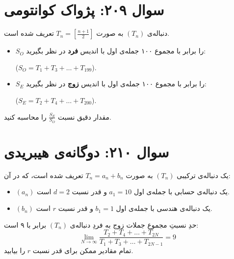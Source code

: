 \documentclass[12pt]{article}
\begin{document}
\section*{سوال ۲۰۹: پژواک کوانتومی}
دنباله‌ی $(T_n)$ به صورت $T_n = \left[\frac{n+1}{2}\right]$ تعریف شده است.
\begin{itemize}[rightmargin=2cm]
	\item $S_O$ را برابر با مجموع ۱۰۰ جمله‌ی اول با اندیس \textbf{فرد} در نظر بگیرید:
	
	\vspace{0.1cm}
	 ($S_O = T_1 + T_3 + \dots + T_{199}$).
	\item $S_E$ را برابر با مجموع ۱۰۰ جمله‌ی اول با اندیس \textbf{زوج} در نظر بگیرید:
	
	\vspace{0.2cm}
	 ($S_E = T_2 + T_4 + \dots + T_{200}$).
\end{itemize}

مقدار دقیق نسبت $\frac{S_E}{S_O}$ را محاسبه کنید.

\vspace{1cm}
\hrulefill
\vspace{1cm}


\section*{سوال ۲۱۰: دوگانه‌ی هیبریدی}
یک دنباله‌ی ترکیبی $(T_n)$ به صورت $T_n = a_n + b_n$ تعریف شده است، که در آن:
\begin{itemize}[rightmargin=2cm]
	\item $(a_n)$ یک دنباله‌ی حسابی با جمله‌ی اول $a_1=10$ و قدر نسبت $d=2$ است.
	\item $(b_n)$ یک دنباله‌ی هندسی با جمله‌ی اول $b_1=1$ و قدر نسبت $r$ است.
\end{itemize}
\vspace{0.5cm}

حدِ نسبتِ مجموع جملات زوج به فردِ دنباله‌ی $(T_n)$ برابر با ۹ است:
\[ \lim_{N \to \infty} \frac{T_2 + T_4 + \dots + T_{2N}}{T_1 + T_3 + \dots + T_{2N-1}} = 9 \]
\vspace{0.5cm}
تمام مقادیر ممکن برای قدر نسبت $r$ را بیابید.

\vspace{1cm}
\hrulefill
\vspace{1cm}

\end{document}
